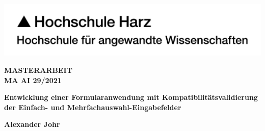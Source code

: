 \begin{titlepage}

    \includegraphics[width=0.5\paperwidth]{Sonstiges/Deckblatt/HSH-Logo-RGB-dt.pdf}

    \begin{center}

        \vfill

        \Huge{\textbf{\MakeUppercase{Masterarbeit}}}\\
        \vspace{1mm}
        \large{\textbf{\textsc{MA AI 29/2021}}}

        \vfill
        \Large{\textbf{Entwicklung einer Formularanwendung mit Kompatibilitätsvalidierung der Einfach- und Mehrfachauswahl-Eingabefelder}}

        \vfill
        \vfill
        \vfill




        \Large\textbf{Alexander Johr}




        \vspace{5mm}

    \end{center}

\end{titlepage}